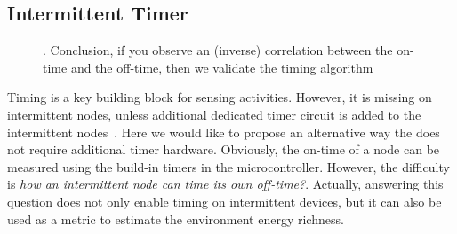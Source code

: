 \subsection{Intermittent Timer}
\begin{figure}[t]
		\centering
		\caption{. Conclusion, if you observe an (inverse) correlation between the on-time and the off-time, then we validate the timing algorithm}
		\label{fig:solarPwrCoIS}
\end{figure} 
\label{subsec:interTimer}
Timing is a key building block for sensing activities. However, it is missing on intermittent nodes, unless additional dedicated timer circuit is added to the intermittent nodes~\cite{hester2017timely}. Here we would like to propose an alternative way the does not require additional timer hardware. Obviously, the on-time of a node can be measured using the build-in timers in the microcontroller. However, the difficulty is \textit{how an intermittent node can time its own off-time?}. Actually, answering this question does not only enable timing on intermittent devices, but it can also be used as a metric to estimate the environment energy richness. 

